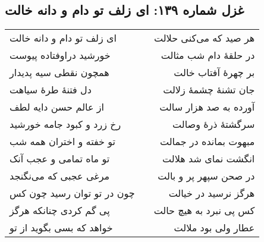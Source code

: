 \begin{center}
\section*{غزل شماره ۱۳۹: ای زلف تو دام و دانه خالت}
\label{sec:139}
\begin{longtable}{l p{0.5cm} r}
ای زلف تو دام و دانه خالت
&&
هر صید که می‌کنی حلالت
\\
خورشید دراوفتاده پیوست
&&
در حلقهٔ دام شب مثالت
\\
همچون نقطی سیه پدیدار
&&
بر چهرهٔ آفتاب خالت
\\
دل فتنهٔ طرهٔ سیاهت
&&
جان تشنهٔ چشمهٔ زلالت
\\
از عالم حسن دایه لطف
&&
آورده به صد هزار سالت
\\
رخ زرد و کبود جامه خورشید
&&
سرگشتهٔ ذرهٔ وصالت
\\
تو خفته و اختران همه شب
&&
مبهوت بمانده در جمالت
\\
تو ماه تمامی و عجب آنک
&&
انگشت نمای شد هلالت
\\
مرغی عجبی که می‌نگنجد
&&
در صحن سپهر پر و بالت
\\
چون در تو توان رسید چون کس
&&
هرگز نرسید در خیالت
\\
پی گم کردی چنانکه هرگز
&&
کس پی نبرد به هیچ حالت
\\
خواهد که بسی بگوید از تو
&&
عطار ولی بود ملالت
\\
\end{longtable}
\end{center}
